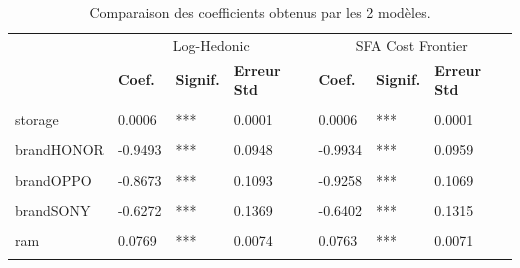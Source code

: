 \documentclass[
  12pt,
]{report}
\begin{document}
\begin{table}[!h]

\caption{\label{tab:loghedonic_sfa_comp}Comparaison des coefficients obtenus par les 2 modèles.}
\centering
\begin{tabular}[t]{lllllll}
\toprule
\multicolumn{1}{c}{ } & \multicolumn{3}{c}{Log-Hedonic} & \multicolumn{3}{c}{SFA Cost Frontier} \\
\cmidrule(l{3pt}r{3pt}){2-4} \cmidrule(l{3pt}r{3pt}){5-7}
\textbf{ } & \textbf{Coef.} & \textbf{Signif.} & \textbf{Erreur Std} & \textbf{Coef.} & \textbf{Signif.} & \textbf{Erreur Std}\\
\midrule
\cellcolor{gray!6}{(Intercept)} & \cellcolor{gray!6}{4.8489} & \cellcolor{gray!6}{***} & \cellcolor{gray!6}{0.2826} & \cellcolor{gray!6}{4.7458} & \cellcolor{gray!6}{***} & \cellcolor{gray!6}{0.2728}\\
storage & 0.0006 & *** & 0.0001 & 0.0006 & *** & 0.0001\\
\cellcolor{gray!6}{brandGOOGLE} & \cellcolor{gray!6}{-0.533} & \cellcolor{gray!6}{***} & \cellcolor{gray!6}{0.0908} & \cellcolor{gray!6}{-0.5947} & \cellcolor{gray!6}{***} & \cellcolor{gray!6}{0.0907}\\
brandHONOR & -0.9493 & *** & 0.0948 & -0.9934 & *** & 0.0959\\
\cellcolor{gray!6}{brandMOTOROLA} & \cellcolor{gray!6}{-0.9409} & \cellcolor{gray!6}{***} & \cellcolor{gray!6}{0.0669} & \cellcolor{gray!6}{-0.9844} & \cellcolor{gray!6}{***} & \cellcolor{gray!6}{0.0677}\\
\addlinespace
brandOPPO & -0.8673 & *** & 0.1093 & -0.9258 & *** & 0.1069\\
\cellcolor{gray!6}{brandSAMSUNG} & \cellcolor{gray!6}{-0.4111} & \cellcolor{gray!6}{***} & \cellcolor{gray!6}{0.0855} & \cellcolor{gray!6}{-0.496} & \cellcolor{gray!6}{***} & \cellcolor{gray!6}{0.0914}\\
brandSONY & -0.6272 & *** & 0.1369 & -0.6402 & *** & 0.1315\\
\cellcolor{gray!6}{brandXIAOMI} & \cellcolor{gray!6}{-1.0045} & \cellcolor{gray!6}{***} & \cellcolor{gray!6}{0.0646} & \cellcolor{gray!6}{-1.0341} & \cellcolor{gray!6}{***} & \cellcolor{gray!6}{0.0645}\\
ram & 0.0769 & *** & 0.0074 & 0.0763 & *** & 0.0071\\
\addlinespace
\cellcolor{gray!6}{inductionTRUE} & \cellcolor{gray!6}{0.2123} & \cellcolor{gray!6}{***} & \cellcolor{gray!6}{0.0441} & \cellcolor{gray!6}{0.2185} & \cellcolor{gray!6}{***} & \cellcolor{gray!6}{0.0435}\\

\end{tabular}
\end{table}
\end{document}
